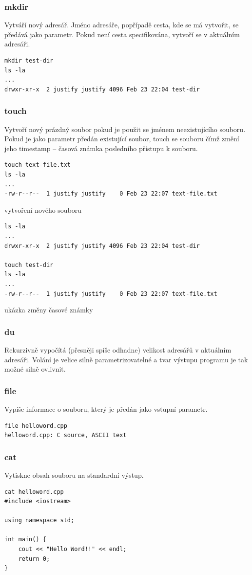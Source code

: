 \documentclass{article}
\begin{document}
\subsubsection{mkdir}
Vytváří nový adresář. Jméno adresáře, popřípadě cesta, kde se má vytvořit, se předává jako parametr. Pokud není cesta specifikována, vytvoří se v aktuálním adresáři.
\begin{verbatim}
mkdir test-dir
ls -la
...
drwxr-xr-x  2 justify justify 4096 Feb 23 22:04 test-dir
\end{verbatim}

\subsubsection{touch}
Vytvoří nový prázdný soubor pokud je použit se jménem neexistujícího souboru. Pokud je jako parametr předán existující soubor, touch se souboru  čímž změní jeho timestamp -- časová známka posledního přístupu k souboru.
\begin{verbatim}
touch text-file.txt
ls -la
...
-rw-r--r--  1 justify justify    0 Feb 23 22:07 text-file.txt
\end{verbatim}
vytvoření nového souboru

\begin{verbatim}
ls -la
...
drwxr-xr-x  2 justify justify 4096 Feb 23 22:04 test-dir

touch test-dir
ls -la
...
-rw-r--r--  1 justify justify    0 Feb 23 22:07 text-file.txt
\end{verbatim}
ukázka změny časové známky

\subsubsection{du}
Rekurzivně vypočítá (přesněji spíše odhadne) velikost adresářů v aktuálním adresáři. Volání je velice silně parametrizovatelné a tvar výstupu programu je tak možné silně ovlivnit.

\subsubsection{file}
Vypíše informace o souboru, který je předán jako vstupní parametr.
\begin{verbatim}
file helloword.cpp
helloword.cpp: C source, ASCII text
\end{verbatim}

\subsubsection{cat}
Vytiskne obsah souboru na standardní výstup.
\begin{verbatim}
cat helloword.cpp
#include <iostream>

using namespace std;

int main() {
	cout << "Hello Word!!" << endl;	
	return 0;	
}
\end{verbatim}
\end{document}
